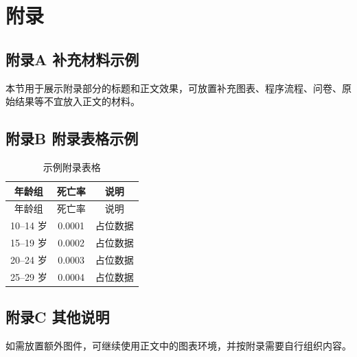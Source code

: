 \cleardoublepage
{}
\chapter*{附录}

\section*{附录A 补充材料示例}
本节用于展示附录部分的标题和正文效果，可放置补充图表、程序流程、问卷、原始结果等不宜放入正文的材料。

\section*{附录B 附录表格示例}
\begin{longtable}{ccc}
  \caption{示例附录表格}\\
  \toprule
  年龄组 & 死亡率 & 说明 \\
  \midrule
  \endfirsthead
  \toprule
  年龄组 & 死亡率 & 说明 \\
  \midrule
  \endhead
  10--14 岁 & 0.0001 & 占位数据 \\
  15--19 岁 & 0.0002 & 占位数据 \\
  20--24 岁 & 0.0003 & 占位数据 \\
  25--29 岁 & 0.0004 & 占位数据 \\
  \bottomrule
\end{longtable}

\section*{附录C 其他说明}
如需放置额外图件，可继续使用正文中的图表环境，并按附录需要自行组织内容。
